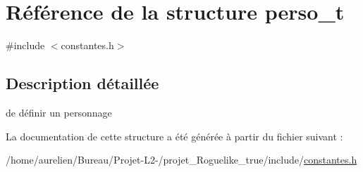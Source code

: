 \hypertarget{structperso__t}{}\section{Référence de la structure perso\+\_\+t}
\label{structperso__t}


{\ttfamily \#include $<$constantes.\+h$>$}



\subsection{Description détaillée}
de définir un personnage 

La documentation de cette structure a été générée à partir du fichier suivant \+:\begin{DoxyCompactItemize}
\item 
/home/aurelien/\+Bureau/\+Projet-\/\+L2-\//projet\+\_\+\+Roguelike\+\_\+true/include/\hyperlink{constantes_8h}{constantes.\+h}\end{DoxyCompactItemize}
